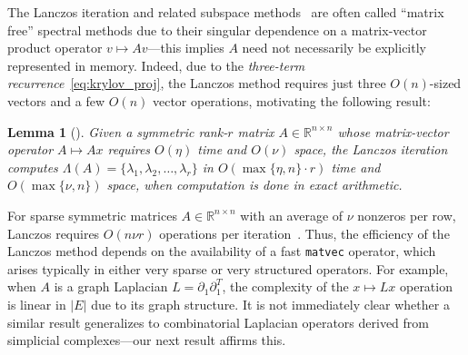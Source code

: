 \documentclass[10pt]{article}
\numberwithin{equation}{section}
\newcommand{\+}{%
	\raisebox{0.18ex}{\scaleobj{0.55}{+}}
}
\newtheorem{corollary}{Corollary}
\newtheorem{lemma}{Lemma}
\theoremstyle{definition}
\theoremstyle{definition}
\begin{document}
 The Lanczos iteration and related subspace methods~\cite{} are often called ``matrix free'' spectral methods due to their singular dependence on a matrix-vector product operator $v \mapsto Av$---this implies $A$ need not necessarily be explicitly represented in memory. 
Indeed, due to the \emph{three-term recurrence}~\eqref{eq:krylov_proj}, the Lanczos method requires just three $O(n)$-sized vectors and a few $O(n)$ vector operations, motivating the following result:
\begin{lemma}[\cite{parlett1994we, simon1984analysis}]\label{lemma:exact_arith_lanczos}
	Given a symmetric rank-$r$ matrix $A \in \mathbb{R}^{n \times n}$ whose matrix-vector operator $A \mapsto A x$ requires $O(\eta)$ time and $O(\nu)$ space, the Lanczos iteration computes $\Lambda(A) = \{ \lambda_1, \lambda_2, \dots, \lambda_r \}$ in $O(\max\{\eta, n\}\cdot r)$ time and $O(\max\{\nu, n\})$ space, when computation is done in exact arithmetic. 
\end{lemma}
\noindent For sparse symmetric matrices $A \in \mathbb{R}^{n \times n}$ with an average of $\nu$ nonzeros per row, Lanczos requires $O(n\nu r)$ operations per iteration~\cite{golub2013matrix}. 
Thus, the efficiency of the Lanczos method depends on the availability of a fast \texttt{matvec} operator, which arises typically in either very sparse or very structured operators.
For example, when $A$ is a graph Laplacian $L = \partial_1 \partial_1^T$, the complexity of the $x \mapsto L x$ operation is linear in $\lvert E \rvert$ due to its graph structure.
It is not immediately clear whether a similar result generalizes to combinatorial Laplacian operators derived from simplicial complexes---our next result affirms this.
\end{document}
